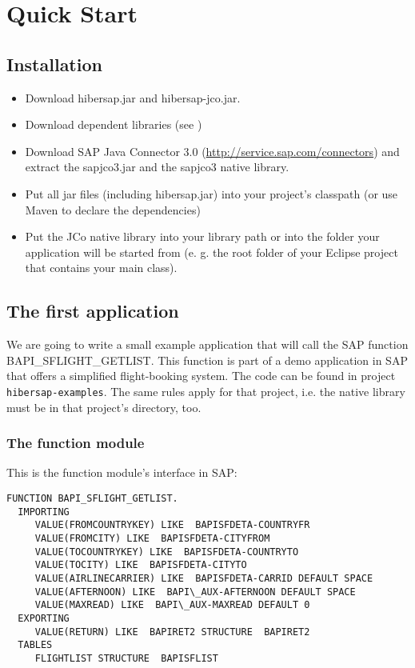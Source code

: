 \chapter{Quick Start}
\label{cha:QuickStart}

\section{Installation}

\begin{itemize}
  \item Download hibersap.jar and hibersap-jco.jar. 
  \item Download dependent libraries (see \urlHibersapDependencies)
  \item Download SAP Java Connector 3.0 (\url{http://service.sap.com/connectors}) and extract the sapjco3.jar and the
  sapjco3 native library. 
  \item Put all jar files (including hibersap.jar) into your project's classpath (or use Maven to declare the
  dependencies)
  \item Put the JCo native library into your library path or into the folder your application will be started
    from (e. g. the root folder of your Eclipse project that contains your main class).
\end{itemize} 


\section{The first application}

We are going to write a small example application that will call the SAP function BAPI\_SFLIGHT\_GETLIST.
This function is part of a demo application in SAP that offers a simplified flight-booking system.
The code can be found in project {\tt hibersap-examples}. The same rules apply for that project, i.e. the native
library must be in that project's directory, too.


\subsection{The function module}

This is the function module's interface in SAP:

\begin{Verbatim}[frame=single,label=The ABAP Function]
FUNCTION BAPI_SFLIGHT_GETLIST.
  IMPORTING
     VALUE(FROMCOUNTRYKEY) LIKE  BAPISFDETA-COUNTRYFR
     VALUE(FROMCITY) LIKE  BAPISFDETA-CITYFROM
     VALUE(TOCOUNTRYKEY) LIKE  BAPISFDETA-COUNTRYTO
     VALUE(TOCITY) LIKE  BAPISFDETA-CITYTO
     VALUE(AIRLINECARRIER) LIKE  BAPISFDETA-CARRID DEFAULT SPACE
     VALUE(AFTERNOON) LIKE  BAPI\_AUX-AFTERNOON DEFAULT SPACE
     VALUE(MAXREAD) LIKE  BAPI\_AUX-MAXREAD DEFAULT 0
  EXPORTING
     VALUE(RETURN) LIKE  BAPIRET2 STRUCTURE  BAPIRET2
  TABLES
     FLIGHTLIST STRUCTURE  BAPISFLIST
\end{Verbatim}

